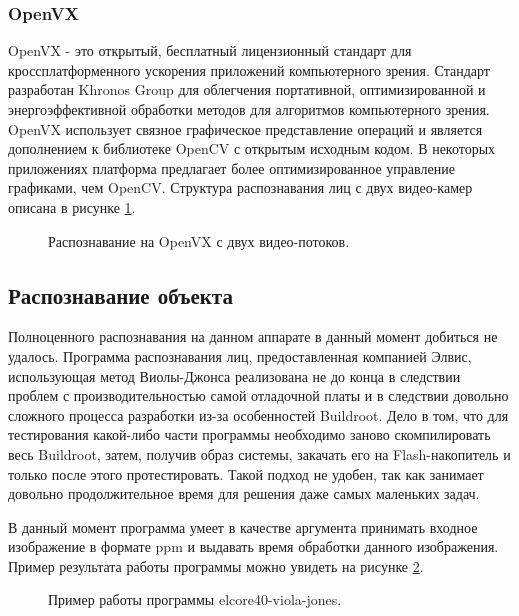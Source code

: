\documentclass[12pt,a4paper]{scrartcl}
\begin{document}
		\subsubsection{OpenVX}
		
			OpenVX - это открытый, бесплатный лицензионный стандарт для кроссплатформенного ускорения приложений компьютерного зрения. Стандарт разработан Khronos Group для облегчения портативной, оптимизированной и энергоэффективной обработки методов для алгоритмов компьютерного зрения. OpenVX использует связное графическое представление операций и является дополнением к библиотеке OpenCV с открытым исходным кодом. В некоторых приложениях платформа предлагает более оптимизированное управление графиками, чем OpenCV\cite{bib:OpenVX_Wikipedia}. Структура распознавания лиц с двух видео-камер описана в рисунке \ref{fig:Stereo_Vision_OpenVX}\cite{bib:OpenVX_Habr}.
			
			\begin{figure}[h]
				\caption{Распознавание на OpenVX с двух видео-потоков.}
				\label{fig:Stereo_Vision_OpenVX}
			\end{figure}
			
	
	\subsection{Распознавание объекта}
	
		Полноценного распознавания на данном аппарате в данный момент добиться не удалось. Программа распознавания лиц, предоставленная компанией Элвис, использующая метод Виолы-Джонса реализована не до конца в следствии проблем с производительностью самой отладочной платы и в следствии довольно сложного процесса разработки из-за особенностей Buildroot. Дело в том, что для тестирования какой-либо части программы необходимо заново скомпилировать весь Buildroot, затем, получив образ системы, закачать его на Flash-накопитель и только после этого протестировать. Такой подход не удобен, так как занимает довольно продолжительное время для решения даже самых маленьких задач.
		
		В данный момент программа умеет в качестве аргумента принимать входное изображение в формате ppm и выдавать время обработки данного изображения. Пример результата работы программы можно увидеть на рисунке \ref{fig:Viola-Jones_Putty}.
		
		\begin{figure}[h]
			\caption{Пример работы программы elcore40-viola-jones.}
			\label{fig:Viola-Jones_Putty}
		\end{figure}
	
\end{document}

